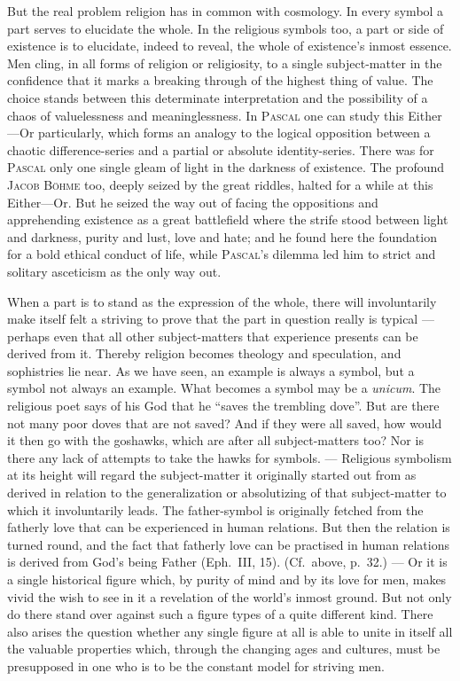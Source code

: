 \documentclass[12pt]{book}
\newcommand{\opage}[1]{\marginnote{\footnotesize\textit{[#1]}}}
\begin{document}
But the real problem religion has in common with cosmology. In every symbol a part
serves to elucidate the whole. In the religious symbols too, a part or side of
existence is to elucidate, indeed to reveal, the whole of existence's inmost
essence. Men cling, in all forms of religion or religiosity, to a single
subject-matter in the confidence that it marks a breaking through of the highest
thing of value. The choice stands between this determinate interpretation and the
possibility of a chaos of valuelessness and meaninglessness. In \textsc{Pascal} one
can study this Either---Or particularly, which forms an analogy to the logical
opposition between a chaotic difference-series and a partial or absolute
identity-series. \opage{134}There was for \textsc{Pascal} only one single gleam of light in
the darkness of existence. The profound \textsc{Jacob Böhme} too, deeply seized by
the great riddles, halted for a while at this Either---Or. But he seized the way out
of facing the oppositions and apprehending existence as a great battlefield where
the strife stood between light and darkness, purity and lust, love and hate; and he
found here the foundation for a bold ethical conduct of life, while \textsc{Pascal}'s
dilemma led him to strict and solitary asceticism as the only way out.

When a part is to stand as the expression of the whole, there will involuntarily
make itself felt a striving to prove that the part in question really is typical
--- perhaps even that all other subject-matters that experience presents can be
derived from it. Thereby religion becomes theology and speculation, and sophistries
lie near. As we have seen, an example is always a symbol, but a symbol not always an
example. What becomes a symbol may be a \textit{unicum}. The religious poet says of
his God that he ``saves the trembling dove''. But are there not many poor doves that
are not saved? And if they were all saved, how would it then go with the goshawks,
which are after all subject-matters too? Nor is there any lack of attempts to take
the hawks for symbols. --- Religious symbolism at its height will regard the
subject-matter it originally started out from as derived in relation to the
generalization or absolutizing of that subject-matter to which it involuntarily
leads. The father-symbol is originally fetched from the fatherly love that can be
experienced in human relations. But then the relation is turned round, and the fact
that fatherly love can be practised in human relations is derived from God's being
Father (Eph.\ III, 15). (Cf.\ above, p.\ 32.) --- Or it is a single historical figure
which, by purity of mind \opage{135}and by its love for men, makes vivid the wish to see in it
a revelation of the world's inmost ground. But not only do there stand over against
such a figure types of a quite different kind. There also arises the question
whether any single figure at all is able to unite in itself all the valuable
properties which, through the changing ages and cultures, must be presupposed in one
who is to be the constant model for striving men.
\end{document}
